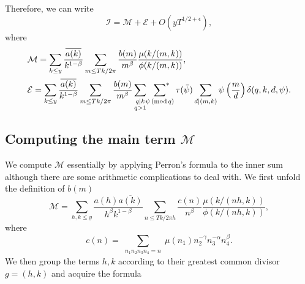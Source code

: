 \documentclass[oneside, 12pt]{amsart}
\theoremstyle{definition}
\renewcommand{\pmod}[1]{\,(\textup{mod}\,#1)}
\newcommand{\mc}{\mathcal}
\newcommand{\ol}{\overline}
\newcommand{\leqs}{\leqslant }
\newcommand{\ben}{\begin{equation}}
\newcommand{\een}{\end{equation} }
\begin{document}
Therefore, we can write 
\ben\label{I decomp}
\mc{I}=\mc{M}+\mc{E}+O(yT^{1/2+\epsilon}),
\een
where 
\begin{align*}
&\mc{M}=\sum_{k\leq y}\frac{\ol{a(k)}}{k^{1-\beta}}\sum_{m\leq Tk/2\pi}\frac{b(m)}{m^\beta}\frac{\mu(k/(m,k))}{\phi(k/(m,k))},\\
&\mc{E}=\sum_{k\leq y}\frac{\ol{a(k)}}{k^{1-\beta}}\sum_{m\leq Tk/2\pi}\frac{b(m)}{m^\beta}\sum_{\substack{q\mid k\\ q>1}}
\sideset{}{^*}\sum_{\psi \pmod q}\tau(\bar{\psi})\sum_{d\mid (m,k)}\psi\left( \frac{m}{d}\right)\delta(q, k, d, \psi).
\end{align*}








\subsection{Computing the main term $\mc{M}$} 
We compute $\mathcal{M}$ essentially by applying Perron's formula to the inner sum although there are some arithmetic complications to deal with. We first unfold the definition of $b(m)$ 
\[
	\mc{M} =  \sum_{h,k\leqs y}\frac{a(h)\ol{a(k)}}{h^\beta k^{1-\beta}}\sum_{n\leqs Tk/2\pi h}\frac{c(n)}{n^\beta}\frac{\mu(k/(nh,k))}{\phi(k/(nh,k))},  
\]
where 
\ben
\label{c(n)}
c(n)=\sum_{\substack{n_1n_2n_3n_4=n}}\mu(n_1)n_2^{-\gamma}n_3^{-\alpha}n_4^\beta.
\een
We then group the terms $h,k$ according to their greatest common divisor $g=(h,k)$ and acquire the formula 
\end{document}
